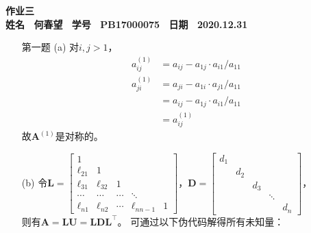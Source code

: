 \documentclass[12pt,a4paper,utf8]{ctexart}
\begin{document}

\begin{center}
\textbf{作业三}\\
\textbf{姓名 ~何春望~ 学号 ~PB17000075~ 日期 ~2020.12.31}\\
\end{center}
\textit{}
\vspace{\baselineskip}

\begin{enumerate}
\item[第一题] 
\subitem(a)
对$i,j > 1$，
\begin{equation}
    \begin{aligned}
        a_{ij}^{(1)} &= a_{ij} - a_{1j} \cdot a_{i1}/a_{11}\\
        a_{ji}^{(1)} &= a_{ji} - a_{1i} \cdot a_{j1}/a_{11}\\
        &= a_{ij} - a_{1j} \cdot a_{i1}/a_{11}\\
        &= a_{ij}^{(1)}
    \end{aligned}
\end{equation}
故$\mathbf{A}^{(1)}$是对称的。

\subitem(b)
令$\mathbf{L} = \begin{bmatrix}
    1 \\
    \ell_{21} & 1 \\
    \ell_{31} & \ell_{32} & 1 \\
    \cdots & \cdots & \cdots & \ddots \\
    \ell_{n1} & \ell_{n2} & \cdots & \ell_{n n-1} & 1
\end{bmatrix}$，$\mathbf{D} = \begin{bmatrix}
    d_1 \\
    & d_2 \\
    && d_3 \\
    &&& \ddots \\
    &&&& d_n
\end{bmatrix}$，\\
则有$\mathbf{A}=\mathbf{L}\mathbf{U}=\mathbf{L}\mathbf{D}\mathbf{L}^\intercal$。
可通过以下伪代码解得所有未知量：


\text{\{ }



\text{~~~~\{ }



\end{enumerate}
\end{document}
